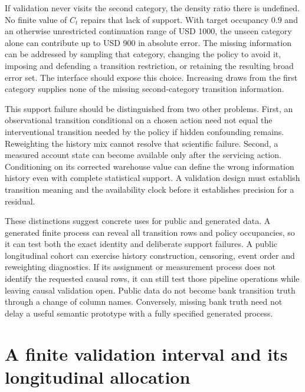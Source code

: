 If validation never visits the second category, the density ratio there is
undefined. No finite value of $C_t$ repairs that lack of support. With target
occupancy $0.9$ and an otherwise unrestricted continuation range of USD 1000,
the unseen category alone can contribute up to USD 900 in absolute error.
The missing information can be addressed by sampling that category, changing
the policy to avoid it, imposing and defending a transition restriction, or
retaining the resulting broad error set. The interface should expose this
choice. Increasing draws from the first category supplies none of the
missing second-category transition information.~\citep{exec17_s5_occupied}

This support failure should be distinguished from two other problems. First,
an observational transition conditional on a chosen action need not equal
the interventional transition needed by the policy if hidden confounding
remains. Reweighting the history mix cannot resolve that scientific failure.
Second, a measured account state can become available only after the
servicing action. Conditioning on its corrected warehouse value can define
the wrong information history even with complete statistical support. A
validation design must establish transition meaning and the availability
clock before it establishes precision for a residual.

These distinctions suggest concrete uses for public and generated data. A
generated finite process can reveal all transition rows and policy
occupancies, so it can test both the exact identity and deliberate support
failures. A public longitudinal cohort can exercise history construction,
censoring, event order and reweighting diagnostics. If its assignment or
measurement process does not identify the requested causal rows, it can still
test those pipeline operations while leaving causal validation open. Public
data do not become bank transition truth through a change of column names.
Conversely, missing bank truth need not delay a useful semantic prototype
with a fully specified generated process.

\section{A finite validation interval and its longitudinal allocation}
\label{exec17:s5-validation}

